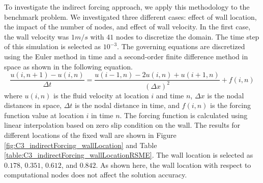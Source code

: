 To investigate the indirect forcing approach, we apply this methodology to the benchmark problem. We investigated three different cases: effect of wall location, the impact of the number of nodes, and effect of wall velocity. In the first case, the wall velocity was $1 m/s$ with $41$ nodes to discretize the domain. The time step of this simulation is selected as $10^{-3}$. The governing equations are discretized using the Euler method in time and a second-order finite difference method in space as shown in the following equation.
%
\begin{equation}
    \frac{u(i, n+1) - u(i, n)}{\Delta t} = \frac{u(i - 1, n) - 2u(i, n) + u(i + 1, n)}{(\Delta x)^2} + f(i, n)
\end{equation}
%
where $u(i, n)$ is the fluid velocity at location $i$ and time $n$, $\Delta x$ is the nodal distances in space, $\Delta t$ is the nodal distance in time, and $f(i,n)$ is the forcing function value at location $i$ in time $n$. The forcing function is calculated using linear interpolation based on zero slip condition on the wall. The results for different locations of the fixed wall are shown in Figure \ref{fig:C3_indirectForcing_wallLocation} and Table \ref{table:C3_indirectForcing_wallLocationRSME}. The wall location is selected as $0.178$, $0.351$, $0.612$, and $0.842$. As shown here, the wall location with respect to computational nodes does not affect the solution accuracy.
%

